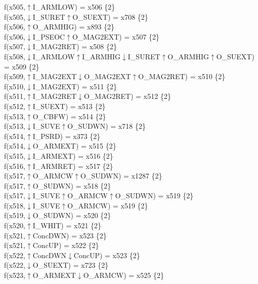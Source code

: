 f(x505,$\uparrow$I\_ARMLOW) = x506 \{2\} \\  
f(x505,$\downarrow$I\_SURET$\uparrow$O\_SUEXT) = x708 \{2\} \\  
f(x506,$\uparrow$O\_ARMHIG) = x893 \{2\} \\  
f(x506,$\downarrow$I\_PSEOC$\uparrow$O\_MAG2EXT) = x507 \{2\} \\  
f(x507,$\downarrow$I\_MAG2RET) = x508 \{2\} \\  
f(x508,$\downarrow$I\_ARMLOW$\uparrow$I\_ARMHIG$\downarrow$I\_SURET$\uparrow$O\_ARMHIG$\uparrow$O\_SUEXT) = x509 \{2\} \\  
f(x509,$\uparrow$I\_MAG2EXT$\downarrow$O\_MAG2EXT$\uparrow$O\_MAG2RET) = x510 \{2\} \\  
f(x510,$\downarrow$I\_MAG2EXT) = x511 \{2\} \\  
f(x511,$\uparrow$I\_MAG2RET$\downarrow$O\_MAG2RET) = x512 \{2\} \\  
f(x512,$\uparrow$I\_SUEXT) = x513 \{2\} \\  
f(x513,$\uparrow$O\_CBFW) = x514 \{2\} \\  
f(x513,$\downarrow$I\_SUVE$\uparrow$O\_SUDWN) = x718 \{2\} \\  
f(x514,$\uparrow$I\_PSRD) = x373 \{2\} \\  
f(x514,$\downarrow$O\_ARMEXT) = x515 \{2\} \\  
f(x515,$\downarrow$I\_ARMEXT) = x516 \{2\} \\  
f(x516,$\uparrow$I\_ARMRET) = x517 \{2\} \\  
f(x517,$\uparrow$O\_ARMCW$\uparrow$O\_SUDWN) = x1287 \{2\} \\  
f(x517,$\uparrow$O\_SUDWN) = x518 \{2\} \\  
f(x517,$\downarrow$I\_SUVE$\uparrow$O\_ARMCW$\uparrow$O\_SUDWN) = x519 \{2\} \\  
f(x518,$\downarrow$I\_SUVE$\uparrow$O\_ARMCW) = x519 \{2\} \\  
f(x519,$\downarrow$O\_SUDWN) = x520 \{2\} \\  
f(x520,$\uparrow$I\_WHIT) = x521 \{2\} \\  
f(x521,$\uparrow$ConcDWN) = x523 \{2\} \\  
f(x521,$\uparrow$ConcUP) = x522 \{2\} \\  
f(x522,$\uparrow$ConcDWN$\downarrow$ConcUP) = x523 \{2\} \\  
f(x522,$\downarrow$O\_SUEXT) = x723 \{2\} \\  
f(x523,$\uparrow$O\_ARMEXT$\downarrow$O\_ARMCW) = x525 \{2\} \\  
